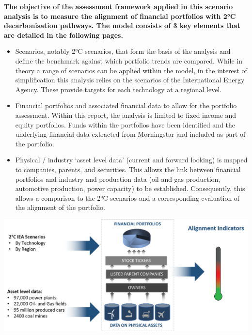 \documentclass[10pt,table,a4]{article}\usepackage[]{graphicx}\usepackage[]{color}
\begin{document}
	\begin{multicols}{2}
		\textbf{The objective of the assessment framework applied in this scenario analysis is to measure the alignment of financial portfolios with 2°C decarbonisation pathways. The model consists of 3 key elements that are detailed in the following pages.}
		
		
		\begin{itemize}
			
			\item {Scenarios, notably 2°C scenarios, that form the basis of the analysis and define the benchmark against which portfolio trends are compared. While in theory a range of scenarios can be applied within the model, in the interest of simplification this analysis relies on the scenarios of the International Energy Agency. These provide targets for each technology at a regional level. }
			
			\item{Financial portfolios and associated financial data to allow for the portfolio assessment. Within this report, the analysis is limited to fixed income and equity portfolios. Funds within the portfolios have been identified and the underlying financial data extracted from Morningstar and included as part of the portfolio. }
			
			\item{Physical / industry `asset level data' (current and forward looking) is mapped to companies, parents, and securities. This 	allows the link between financial portfolios and industry and production data (oil and gas production, automotive production, power capacity) to be established. Consequently, this allows a comparison to the 2°C scenarios and a corresponding evaluation of the alignment of the portfolio. }
			
		\end{itemize}
	\end{multicols}
	
	
	\includegraphics[trim = {0 0cm 0 0},width=1\linewidth]{ReportGraphics/SummaryChart}
	
\end{document}

